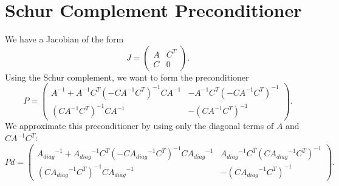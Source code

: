 \documentclass{article}[10pt]
\newcommand{\Adiag}{\ensuremath{A_\mathit{diag}}}
\begin{document}
\section{Schur Complement Preconditioner}

We have a Jacobian of the form
\begin{equation}
  J = \left( \begin{array}{cc}
    A & C^T \\
    C & 0
  \end{array} \right).
\end{equation}
Using the Schur complement, we want to form the preconditioner
\begin{equation}
  P = \left( \begin{array}{cc}
    A^{-1} + A^{-1} C^T (-C A^{-1} C^T)^{-1} C A^{-1} &
    -A^{-1} C^T (-C A^{-1} C^T)^{-1} \\
    (C A^{-1} C^T)^{-1} C A^{-1} & -(C A^{-1} C^T)^{-1}
  \end{array} \right).
\end{equation}
We approximate this preconditioner by using only the diagonal terms of $A$ and $C A^{-1} C^T$:
\begin{equation}
  Pd = \left( \begin{array}{cc}
    \Adiag^{-1} + \Adiag^{-1} C^T (-C \Adiag^{-1} C^T)^{-1} C \Adiag^{-1} &
    \Adiag^{-1} C^T (C \Adiag^{-1} C^T)^{-1} \\
    (C \Adiag^{-1} C^T)^{-1} C \Adiag^{-1} & -(C \Adiag^{-1} C^T)^{-1}
  \end{array} \right).
\end{equation}


\end{document}
